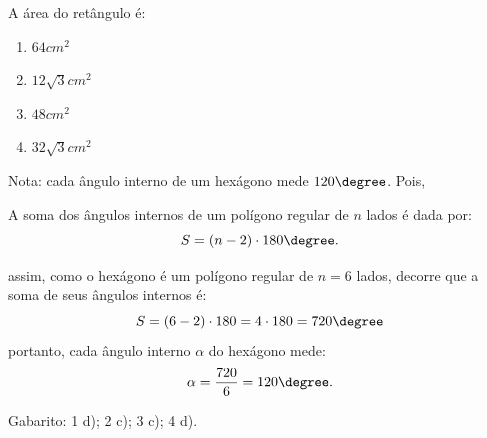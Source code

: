 \begin{enumerate}
  A área do retângulo é:
  \begin{enumerate}
  \item $64cm^2$
  \item $12\sqrt{3}cm^2$
  \item $48cm^2$
  \item $32\sqrt{3}cm^2$
 \end{enumerate}

 {\color{red} Nota:} cada ângulo interno de um hexágono mede $120\degree$.
 Pois,
 \vskip0.3cm
\colorbox{azul}{
 \begin{minipage}{0.9\linewidth}
 \begin{center}
 A soma dos ângulos internos de um polígono regular de $n$ lados é dada por:
  \[S= (n-2)\cdot 180 \degree .\]
 \end{center}
 \end{minipage}}
 \vskip0.3cm
 assim, como o hexágono é um polígono regular de $n= 6$ lados, decorre que a soma de seus ângulos internos é:
 \[S= (6-2)\cdot 180= 4 \cdot 180= 720 \degree\]
 portanto, cada ângulo interno $\alpha$ do hexágono mede:
 \[\alpha= \frac{720}{6}= 120 \degree .\]


 \end{enumerate}

 Gabarito: 1 d); 2 c); 3 c); 4 d).
